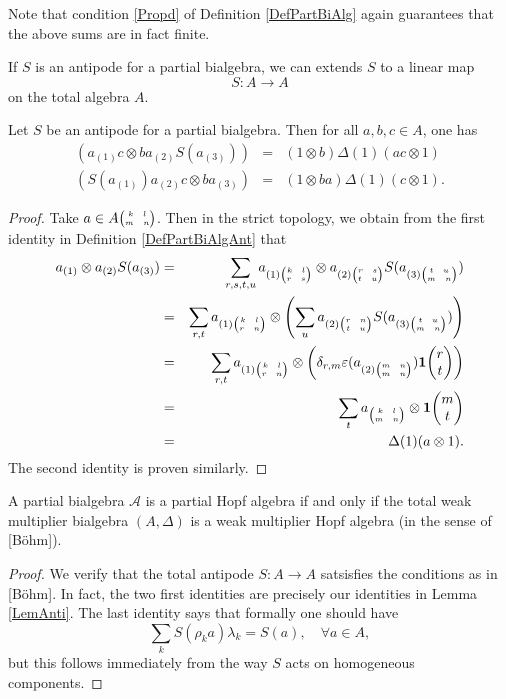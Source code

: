 \begin{Rem} Note that condition \ref{Propd} of Definition \ref{DefPartBiAlg} again guarantees that the above sums are in fact finite.
\end{Rem}

If $S$ is an antipode for a partial bialgebra, we can extends $S$ to a linear map \[S:A\rightarrow A\] on the total algebra $A$. 

\begin{Lem}\label{LemAnti} Let $S$ be an antipode for a partial bialgebra. Then for all $a,b,c\in A$, one has \begin{eqnarray*} (a_{(1)}c\otimes ba_{(2)}S(a_{(3)})) &=& (1\otimes b)\Delta(1)(ac\otimes 1)\\ (S(a_{(1)})a_{(2)}c\otimes ba_{(3)})&=& (1\otimes ba)\Delta(1)(c\otimes 1).\end{eqnarray*}
\end{Lem} 


\begin{proof} Take $a \in A{{\tiny \begin{pmatrix} k \quad l \\ m \quad n\end{pmatrix}}}$. Then in the strict topology, we obtain from the first identity in Definition \ref{DefPartBiAlgAnt} that 
\begin{eqnarray*}
a_{(1)}\otimes a_{(2)}S(a_{(3)}) 
&=& 
\sum_{r,s,t,u} a_{(1){\tiny \begin{pmatrix} k \quad l \\ r \quad s\end{pmatrix}}} \otimes a_{(2){\tiny \begin{pmatrix} r \quad s \\ t \quad u\end{pmatrix}}}S(a_{(3){\tiny \begin{pmatrix} t \quad u \\ m \quad n\end{pmatrix}}})\\ 
&=& 
\sum_{r,t} a_{(1){\tiny \begin{pmatrix} k \quad l \\ r \quad n\end{pmatrix}}} \otimes \left(\sum_{u} a_{(2){\tiny \begin{pmatrix} r \quad n \\ t \quad u\end{pmatrix}}}S(a_{(3){\tiny \begin{pmatrix} t \quad u \\ m \quad n\end{pmatrix}}})\right)\\ 
&=& 
\sum_{r,t} a_{(1){\tiny \begin{pmatrix} k \quad l \\ r \quad n\end{pmatrix}}} \otimes \left(\delta_{r,m}\varepsilon(a_{(2){\tiny \begin{pmatrix} m \quad n \\ m \quad n\end{pmatrix}}})\mathbf{1}\!\begin{pmatrix} r \\ t\end{pmatrix}\right)\\
&=&
\sum_{t} a_{{\tiny \begin{pmatrix} k \quad l \\ m \quad n\end{pmatrix}}} \otimes \mathbf{1}\!\begin{pmatrix} m \\ t\end{pmatrix}\\
&=&
\Delta(1)(a\otimes 1).
\end{eqnarray*}
The second identity is proven similarly.
\end{proof} 

\begin{Prop} A partial bialgebra $\mathscr{A}$ is a partial Hopf algebra if and only if the total weak multiplier bialgebra $(A,\Delta)$ is a weak multiplier Hopf algebra (in the sense of [B\"{o}hm]). 
\end{Prop} 

\begin{proof} We verify that the total antipode $S:A\rightarrow A$ satsisfies the conditions as in [B\"{o}hm]. In fact, the two first identities are precisely our identities in Lemma \ref{LemAnti}. The last identity says that formally one should have \[\sum_kS(\rho_k a)\lambda_k = S(a),\quad \forall a\in A,\] but this follows immediately from the way $S$ acts on homogeneous components.
\end{proof}

